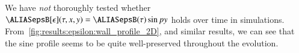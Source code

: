 
        We have \emph{not} thoroughly tested whether $\epsB[\epsilon](\tau, x,y)=\epsB(\tau) \sin{py}$ holds over time in simulations. From~\cref{fig:results:epsilon:wall_profile_2D}, and similar results, we can see that the sine profile seems to be quite well-preserved throughout the evolution. 







